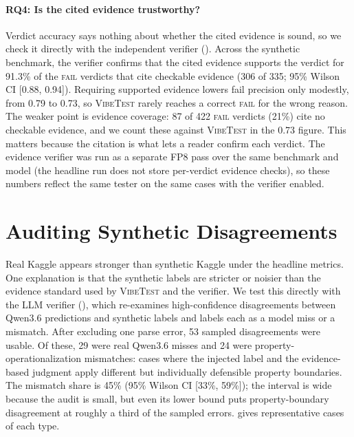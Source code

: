 \documentclass[11pt]{article}
\newcommand{\fail}{\textsc{fail}}
\newcommand{\vibetest}{\textsc{VibeTest}}
\newcommand{\qwen}{Qwen3.6}
\begin{document}
\paragraph{RQ4: Is the cited evidence trustworthy?}
Verdict accuracy says nothing about whether the cited evidence is sound, so we
check it directly with the independent verifier ().
Across the synthetic benchmark, the verifier confirms that the cited evidence
supports the verdict for 91.3\% of the \fail{} verdicts that cite checkable
evidence (306 of 335; 95\% Wilson CI [0.88, 0.94]).
Requiring supported evidence lowers fail precision only modestly, from 0.79 to
0.73, so \vibetest{} rarely reaches a correct \fail{} for the wrong reason.
The weaker point is evidence coverage: 87 of 422 \fail{} verdicts (21\%) cite no
checkable evidence, and we count these against \vibetest{} in the 0.73 figure.
This matters because the citation is what lets a reader confirm each verdict.
The evidence verifier was run as a separate FP8 pass over the same benchmark and
model (the headline run does not store per-verdict evidence checks), so these
numbers reflect the same tester on the same cases with the verifier enabled.

\section{Auditing Synthetic Disagreements}
\label{sec:audit}

Real Kaggle appears stronger than synthetic Kaggle under the headline metrics.
One explanation is that the synthetic labels are stricter or noisier than the
evidence standard used by \vibetest{} and the verifier.
We test this directly with the LLM verifier (), which
re-examines high-confidence disagreements between \qwen{} predictions and
synthetic labels and labels each as a model miss or a mismatch.
After excluding one parse error, 53 sampled disagreements were usable.
Of these, 29 were real \qwen{} misses and 24 were
property-operationalization mismatches: cases where the injected label and the
evidence-based judgment apply different but individually defensible property
boundaries.
The mismatch share is 45\% (95\% Wilson CI [33\%, 59\%]); the interval is wide
because the audit is small, but even its lower bound puts property-boundary
disagreement at roughly a third of the sampled errors.
 gives representative cases of each type.
\end{document}
